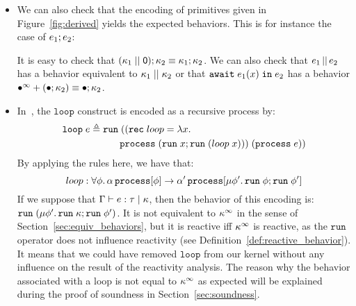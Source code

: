 \documentclass[9pt]{sigplanconf}
\newcommand{\deq}{\triangleq}
\begin{document}
\begin{itemize}
\item We can also check that the encoding of primitives given in Figure~\ref{fig:derived} yields the expected behaviors. This is for instance the case of $e_1 ; e_2$:
%
\par\nobreak{}%
It is easy to check that $(\kappa_1 \mid\mid \textsf{0}) ; \kappa_2  \equiv  \kappa_1 ; \kappa_2$.  We can also check that $e_1 \,||\, e_2$ has a behavior equivalent to $\kappa_1 \mid\mid \kappa_2$ or that $\mathtt{await}\; e_1(x) \;\mathtt{in}\; e_2$ has a behavior \mbox{$\bullet^\infty + (\bullet ; \kappa_2) \equiv \bullet ; \kappa_2$}. %

\item In~\cite{Mandel:2005}, the $\mathtt{loop}$ construct is encoded as a recursive process by:
%
\begin{align*}
\eloop{e} \deq &\mathid{run}(( \mathidl{rec} loop = 
     \elam{x}{ \\ &\qquad \eproc{(\eseq{\erun{x}}{\erun{(\eapp{loop}{x})}})}})\; (\eproc{e})) 
\end{align*}
%
By applying the rules here, we have that:
\[ loop: \forall \phi.\, \alpha \,\mathtt{process}[\phi] \rightarrow  \alpha' \,\mathtt{process}[\mu \phi'.\, \mathtt{run}\; \phi ; \mathtt{run}\; \phi'] \]
%
%
If we suppose that \mbox{$\Gamma \vdash e : \tau \mid \kappa$}, then the behavior of this encoding is:
 $\mathtt{run}\; (\mu \phi'.\, \mathtt{run}\; \kappa ; \mathtt{run}\; \phi')$.
It is not equivalent to $\kappa^\infty$ in the sense of Section~\ref{sec:equiv_behaviors}, but it is reactive iff $\kappa^\infty$ is reactive, as the $\mathtt{run}$ operator does not influence reactivity (see Definition~\ref{def:reactive_behavior}). It means that we could have removed $\mathtt{loop}$ from our kernel without any influence on the result of the reactivity analysis. The reason why the behavior associated with a loop is not equal to $\kappa^\infty$ as expected will be explained during the proof of soundness in Section~\ref{sec:soundness}.


\end{itemize}
\end{document}
